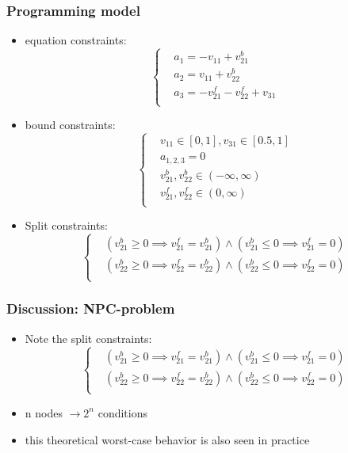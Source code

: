 \documentclass[aspectratio=169%
,serif,mathserif]{beamer}
\begin{document}
\begin{frame}
	\frametitle{Programming model}
	\begin{itemize}
		\item equation constraints:
		\begin{equation}
			\left\{
				\begin{array}{lll}
				& a_{1}=-v_{11}+v_{21}^{b} \\
				& a_{2}=v_{11}+v_{22}^{b} \\
				& a_{3}=-v_{21}^{f}-v_{22}^{f}+v_{31} \\
			\end{array} \right.
		\end{equation}
		\item bound constraints:
		\begin{equation}
			\left\{
				\begin{array}{lll}
				& v_{11} \in[0,1],v_{31} \in[0.5,1] \\
				& a_{1,2,3}= 0 \\
				& v_{21}^{b},v_{22}^{b} \in (-\infty,\infty)\\
				& v_{21}^{f},v_{22}^{f} \in (0,\infty)\\
			\end{array} \right.
		\end{equation}
		\item Split constraints:
		\begin{equation}
			\left\{
				\begin{array}{lll}
				& (v_{21}^{b} \geq 0 \implies v_{21}^{f} = v_{21}^{b}) \wedge (v_{21}^{b} \leq 0 \implies v_{21}^{f} = 0)\\
				& (v_{22}^{b} \geq 0 \implies v_{22}^{f} = v_{22}^{b}) \wedge (v_{22}^{b} \leq 0 \implies v_{22}^{f} = 0) \\
			\end{array} \right.
		\end{equation}
	\end{itemize}
\end{frame}

\begin{frame}
	\frametitle{Discussion: NPC-problem}
	\begin{itemize}
		\item Note the split constraints:
		\begin{equation}
			\left\{
				\begin{array}{lll}
				& (v_{21}^{b} \geq 0 \implies v_{21}^{f} = v_{21}^{b}) \wedge (v_{21}^{b} \leq 0 \implies v_{21}^{f} = 0)\\
				& (v_{22}^{b} \geq 0 \implies v_{22}^{f} = v_{22}^{b}) \wedge (v_{22}^{b} \leq 0 \implies v_{22}^{f} = 0) \\
			\end{array} \right.
		\end{equation}
		\item n nodes $\to 2^n$ conditions
		\item this theoretical worst-case behavior is also seen in practice	
	\end{itemize}
\end{frame}
\end{document}
